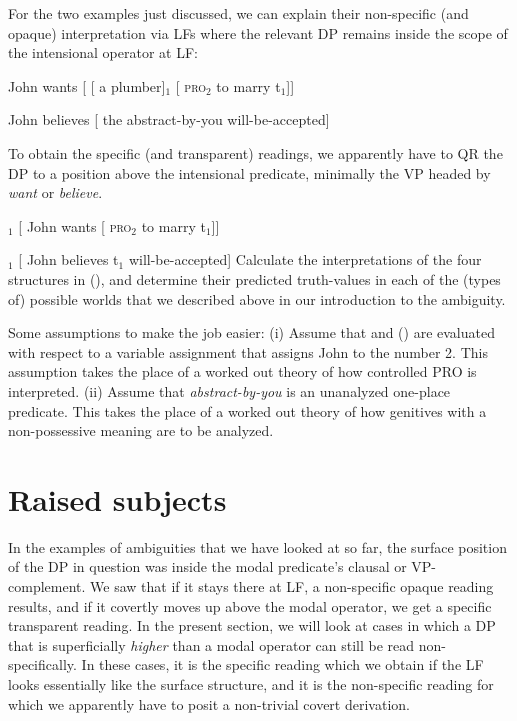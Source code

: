 \begin{exercise}

For the two examples just discussed, we can explain their non-specific (and
opaque) interpretation via LFs where the relevant DP remains inside the scope of
the intensional operator at LF:

\ex\label{first} John wants [ [ a plumber]$_1$ [ \textsc{pro}$_2$ to marry
t$_1$]] \xe

\ex John believes [ the abstract-by-you will-be-accepted] \xe

To obtain the specific (and transparent) readings, we apparently have to QR the
DP to a position above the intensional predicate, minimally the VP headed by
\emph{want} or \emph{believe}.

\ex\null [ a plumber]$_1$ [ John wants [ \textsc{pro}$_2$ to marry t$_1$]] \xe

\ex{}$_1$ [ John believes t$_1$ will-be-accepted] \xe
%	
Calculate the interpretations of the four structures in \dash(\lastx),
and determine their predicted truth-values in each of the (types of) possible
worlds that we described above in our introduction to the ambiguity.
	
Some assumptions to make the job easier: (i) Assume that  and (\blastx)
are evaluated with respect to a variable assignment that assigns John to the
number 2. This assumption takes the place of a worked out theory of how
controlled PRO is interpreted. (ii) Assume that \emph{abstract-by-you} is an
unanalyzed one-place predicate. This takes the place of a worked out theory of
how genitives with a non-possessive meaning are to be analyzed. \eex
\end{exercise}

\section{Raised subjects}
\label{sec:raised}

In the examples of ambiguities that we have looked at so far, the surface
position of the DP in question was inside the modal predicate's clausal or
VP-complement. We saw that if it stays there at LF, a non-specific opaque
reading results, and if it covertly moves up above the modal operator, we get a
specific transparent reading. In the present section, we will look at cases in
which a DP that is superficially \emph{higher} than a modal operator can still
be read non-specifically. In these cases, it is the specific reading which we
obtain if the LF looks essentially like the surface structure, and it is the
non-specific reading for which we apparently have to posit a non-trivial covert
derivation.


